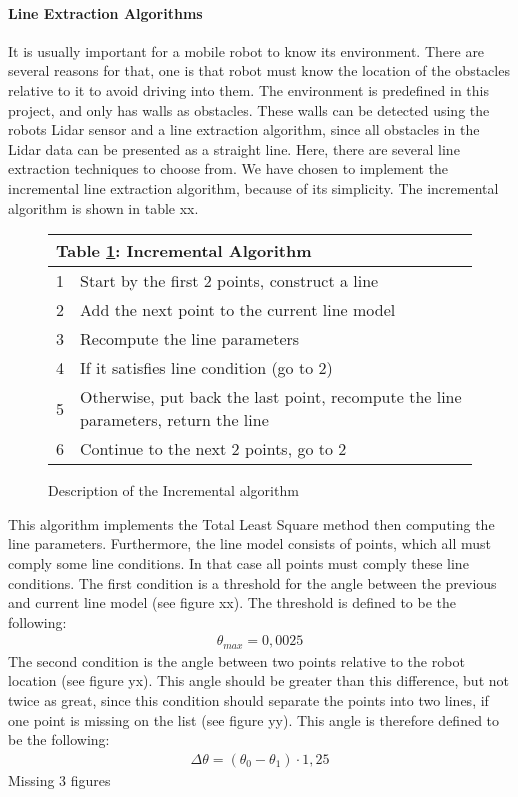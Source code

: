 \documentclass[../Head/Main.tex]{subfiles}
\begin{document}
\paragraph{Line Extraction Algorithms}
It is usually important for a mobile robot to know its environment. There are several reasons for that, one is that robot must know the location of the obstacles relative to it to avoid driving into them. The environment is predefined in this project, and only has walls as obstacles. These walls can be detected using the robots Lidar sensor and a line extraction algorithm, since all obstacles in the Lidar data can be presented as a straight line. Here, there are several line extraction techniques to choose from.
We have chosen to implement the incremental line extraction algorithm, because of its simplicity. The incremental algorithm is shown in table xx.\par
\begin{figure}[H]
	\centering
	\begin{tabular}{c l}
		\hline
		\multicolumn{2}{l}{\textbf{Table							\ref{tab:Incremental}: Incremental Algorithm}}  			\\ \hline
		1 & Start by the first 2 points, construct a 				line \\
		2 & Add the next point to the current line model 		\\
		3 & Recompute the line parameters \\
		4 & If it satisfies line condition (go to 2) \\
		5 & Otherwise, put back the last point, 					recompute the line parameters, return the line  			\\
		6 & Continue to the next 2 points, go to 2 \\ 				\hline
	\end{tabular}
	\caption{Description of the Incremental algorithm}
	\label{tab:Incremental}
\end{figure}
This algorithm implements the Total Least Square method then computing the line parameters. Furthermore, the line model consists of points, which all must comply some line conditions. In that case all points must comply these line conditions. The first condition is a threshold for the angle between the previous and current line model (see figure xx). The threshold is defined to be the following:
\begin{align*}
	\theta_{max} = 0,0025
\end{align*}
The second condition is the angle between two points relative to the robot location (see figure yx). This angle should be greater than this difference, but not twice as great, since this condition should separate the points into two lines, if one point is missing on the list (see figure yy). This angle is therefore defined to be the following:
\begin{align*}
	\Delta\theta = \left(\theta_0 - \theta_1\right)\cdot 1,25
\end{align*}
{\color{red} Missing 3 figures} \par
\end{document}
